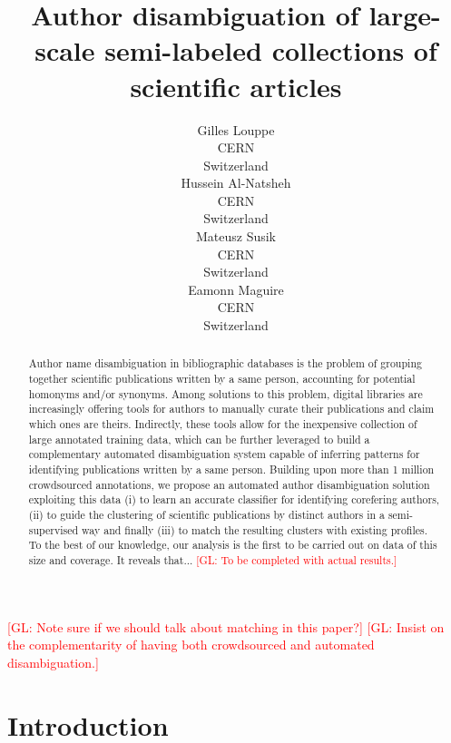 \documentclass{article}
\title{Author disambiguation of large-scale semi-labeled collections of scientific articles}
\author{Gilles Louppe\\
        CERN\\
        Switzerland\\
\And Hussein Al-Natsheh\\
        CERN\\
        Switzerland\\
\And Mateusz Susik\\
        CERN\\
        Switzerland\\
\And Eamonn Maguire\\
        CERN\\
        Switzerland}
\date{}
\newcommand{\glnote}[1]{\textcolor{red}{[GL: #1]}}
\begin{document}
\maketitle

\begin{abstract}

Author name disambiguation in bibliographic databases is the problem of
grouping together scientific publications written by a same person, accounting
for potential homonyms and/or synonyms. Among solutions to this problem,
digital libraries are increasingly offering tools for authors to manually
curate their publications and claim which ones are theirs. Indirectly, these
tools allow for the inexpensive collection of large annotated training data,
which can be further leveraged to build a complementary automated disambiguation system
capable of inferring patterns for identifying publications written by a same
person.  Building upon more than 1 million crowdsourced annotations, we
propose an automated author disambiguation solution exploiting this data (i) to learn
an accurate classifier for identifying corefering authors, (ii) to guide the
clustering of scientific publications by distinct authors in a semi-supervised
way and finally (iii) to match the resulting clusters with existing profiles.
To the best of our knowledge, our analysis is the first to be carried out on
data of this size and coverage. It reveals that... \glnote{To be completed with
actual results.}

\end{abstract}

\glnote{Note sure if we should talk about matching in this paper?}
\glnote{Insist on the complementarity of having both crowdsourced and automated disambiguation.}



\section{Introduction}
\label{introduction}

\end{document}
